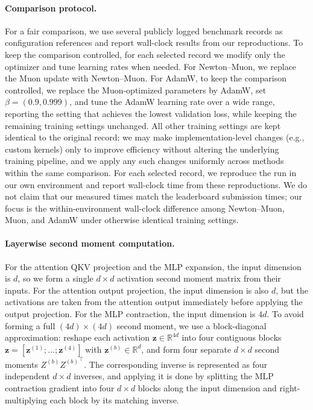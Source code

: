 \documentclass[11pt]{article}
\begin{document}
\paragraph{Comparison protocol.}
For a fair comparison, we use several publicly logged benchmark records as configuration references and report wall-clock results from our reproductions. To keep the comparison controlled, for each selected record we modify only the optimizer and tune learning rates when needed. For Newton--Muon, we replace the Muon update with Newton--Muon. For AdamW, to keep the comparison controlled, we replace the Muon-optimized parameters by AdamW, set $\beta=(0.9,0.999)$, and tune the AdamW learning rate over a wide range, reporting the setting that achieves the lowest validation loss, while keeping the remaining training settings unchanged. All other training settings are kept identical to the original record; we may make implementation-level changes (e.g., custom kernels) only to improve efficiency without altering the underlying training pipeline, and we apply any such changes uniformly across methods within the same comparison. For each selected record, we reproduce the run in our own environment and report wall-clock time from these reproductions. We do not claim that our measured times match the leaderboard submission times; our focus is the within-environment wall-clock difference among Newton--Muon, Muon, and AdamW under otherwise identical training settings.


\paragraph{Layerwise second moment computation.}
For the attention QKV projection and the MLP expansion, the input dimension is \(d\), so we form a single \(d\times d\)
activation second moment matrix from their inputs. For the attention output projection, the input dimension is also \(d\),
but the activations are taken from the attention output immediately before applying the output projection.
For the MLP contraction, the input dimension is \(4d\). To avoid forming a full \((4d)\times(4d)\) second moment, we use a
block-diagonal approximation: reshape each activation \(\boldsymbol{z}\in\mathbb{R}^{4d}\) into four
contiguous blocks \(\boldsymbol{z}=[\boldsymbol{z}^{(1)};\ldots;\boldsymbol{z}^{(4)}]\) with
\(\boldsymbol{z}^{(b)}\in\mathbb{R}^{d}\), and form four separate \(d\times d\) second moments
\({Z}^{(b)}{{Z}^{(b)}}^\top\). The corresponding inverse is represented as four independent \(d\times d\)
inverses, and applying it is done by splitting the MLP contraction gradient into four \(d\times d\) blocks along the input
dimension and right-multiplying each block by its matching inverse.
\end{document}
